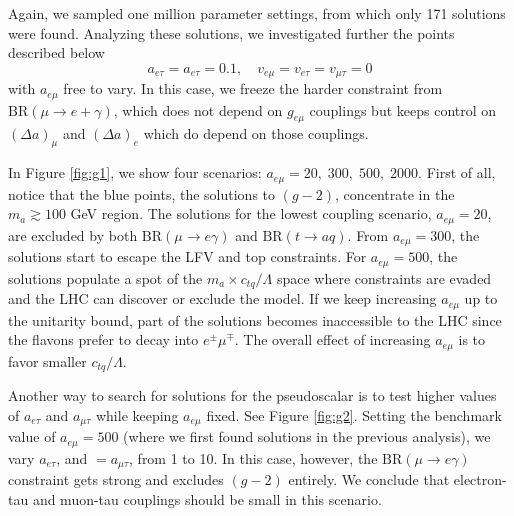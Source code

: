 \documentclass[prd,amsfonts,onecolumn,superscriptaddress,aps,nofootinbib,11pt]{revtex4-1}
\begin{document}
Again, we sampled one million parameter settings, from which only 171 solutions were found. Analyzing these solutions, we investigated further the points described below %
\begin{equation}
    a_{e \tau} = a_{e \tau} = 0.1, \quad v_{e \mu}=v_{e \tau}=v_{\mu \tau}=0
\end{equation}
with $a_{e \mu}$ free to vary. In this case, we freeze the harder constraint from $\mathrm{BR}(\mu\to e+\gamma)$, which does not depend on $g_{e\mu}$ couplings but keeps control on $(\Delta a)_\mu$ and $(\Delta a)_e$ which do depend on those couplings.

In Figure \ref{fig:g1}, we show four scenarios: $a_{e\mu}=20,\; 300,\; 500,\; 2000$. First of all, notice that the blue points, the solutions to $(g-2)$, concentrate in the $m_a\gtrsim 100$ GeV region. The solutions for the lowest coupling scenario, $a_{e\mu}=20$, are excluded by both $\mathrm{BR}(\mu\to e\gamma)$ and $\mathrm{BR}(t\to aq)$. From $a_{e \mu} = 300$, the solutions start to escape the LFV  and top constraints. For $a_{e \mu}=500$, the solutions populate a spot of the $m_a \times c_{tq}/\Lambda$ space where constraints are evaded and the LHC can discover or exclude the model. If we keep increasing $a_{e \mu}$ up to the unitarity bound, part of the solutions becomes inaccessible to the LHC since the flavons prefer to decay into $e^\pm\mu^\mp$. The overall effect of increasing $a_{e\mu}$ is to favor smaller $c_{tq}/\Lambda$.


Another way to search for solutions for the pseudoscalar is to test higher values of $a_{e \tau}$ and $a_{\mu \tau}$ while keeping $a_{e \mu}$ fixed. See Figure \ref{fig:g2}. Setting the benchmark value of $a_{e \mu} = 500$ (where we first found solutions in the previous analysis), we vary $a_{e \tau}$, and $=a_{\mu \tau}$, from 1 to 10. In this case, however, the  $\mathrm{BR}(\mu \to e \gamma)$ constraint gets strong and excludes $(g-2)$ entirely. We conclude that electron-tau and muon-tau couplings should be small in this scenario. 
\end{document}
